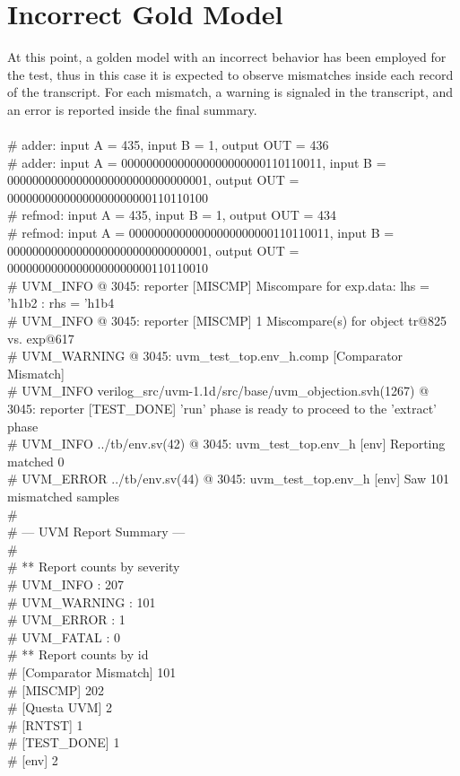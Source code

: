 \section{Incorrect Gold Model}
At this point, a golden model with an incorrect behavior has been employed for the test, thus
in this case it is expected to observe mismatches inside each record of the transcript.
For each mismatch, a warning is signaled in the transcript, and an error is reported inside
the final summary.
\\
\\
\# adder: input A =        435, input B =          1, output OUT =        436\\
\# adder: input A = 00000000000000000000000110110011, input B = 00000000000000000000000000000001, output OUT = 00000000000000000000000110110100\\
\# refmod: input A =         435, input B =           1, output OUT =         434\\
\# refmod: input A = 00000000000000000000000110110011, input B = 00000000000000000000000000000001, output OUT = 00000000000000000000000110110010\\
\# UVM\_INFO @ 3045: reporter [MISCMP] Miscompare for exp.data: lhs = 'h1b2 : rhs = 'h1b4\\
\# UVM\_INFO @ 3045: reporter [MISCMP] 1 Miscompare(s) for object tr@825 vs. exp@617\\
\# UVM\_WARNING @ 3045: uvm\_test\_top.env\_h.comp [Comparator Mismatch] \\
\# UVM\_INFO verilog\_src/uvm-1.1d/src/base/uvm\_objection.svh(1267) @ 3045: reporter [TEST\_DONE] 'run' phase is ready to proceed to the 'extract' phase\\
\# UVM\_INFO ../tb/env.sv(42) @ 3045: uvm\_test\_top.env\_h [env] Reporting matched 0\\
\# UVM\_ERROR ../tb/env.sv(44) @ 3045: uvm\_test\_top.env\_h [env] Saw 101 mismatched samples\\
\# \\
\# --- UVM Report Summary ---\\
\# \\
\# ** Report counts by severity\\
\# UVM\_INFO :  207\\
\# UVM\_WARNING :  101\\
\# UVM\_ERROR :    1\\
\# UVM\_FATAL :    0\\
\# ** Report counts by id\\
\# [Comparator Mismatch]   101\\
\# [MISCMP]   202\\
\# [Questa UVM]     2\\
\# [RNTST]     1\\
\# [TEST\_DONE]     1\\
\# [env]     2\\

